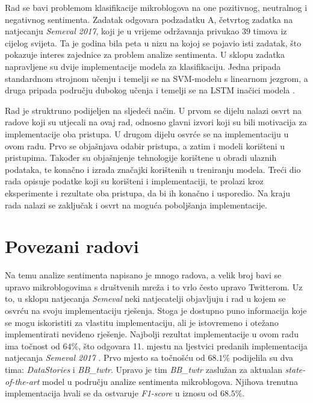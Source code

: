 \documentclass[times, utf8, zavrsni]{fer}
\begin{document}
Rad se bavi problemom klasifikacije mikroblogova na one pozitivnog, neutralnog i negativnog sentimenta. Zadatak odgovara podzadatku A, četvrtog zadatka na natjecanju \emph{Semeval 2017}, koji je u vrijeme održavanja privukao $39$ timova iz cijelog svijeta. Ta je godina bila peta u nizu na kojoj se pojavio isti zadatak, što pokazuje interes zajednice za problem analize sentimenta. U sklopu zadatka napravljene su dvije implementacije modela za klasifikaciju. Jedna pripada standardnom strojnom učenju i temelji se na \gls{SVM}-modelu s linearnom jezgrom, a druga pripada području dubokog učenja i temelji se na \Gls{LSTM} inačici modela .

Rad je struktruno podijeljen na sljedeći način. U prvom se dijelu nalazi osvrt na radove koji su utjecali na ovaj rad, odnosno glavni izvori koji su bili motivacija za implementacije oba pristupa. U drugom dijelu osvrće se na implementaciju u ovom radu. Prvo se objašnjava odabir pristupa, a zatim i modeli korišteni u pristupima. Također su objašnjenje tehnologije korištene u obradi ulaznih podataka, te konačno i izrada značajki korištenih u treniranju modela. Treći dio rada opisuje podatke koji su korišteni i implementaciji, te prolazi kroz eksperimente i rezultate oba pristupa, da bi ih konačno i usporedio. Na kraju rada nalazi se zaključak i osvrt na moguća poboljšanja implementacije.

\chapter{Povezani radovi}


Na temu analize sentimenta napisano je mnogo radova, a velik broj bavi se upravo mikroblogovima s društvenih mreža i to vrlo često upravo Twitterom. Uz to, u sklopu natjecanja \emph{Semeval} neki natjecatelji objavljuju i rad u kojem se osvrću na svoju implementaciju rješenja. Stoga je dostupno puno informacija koje se mogu iskoristiti za vlastitu implementaciju, ali je istovremeno i otežano implementirati neviđeno rješenje. 
Najbolji rezultat implementacije u ovom radu ima točnost od $64\%$, što odgovara 11. mjestu na ljestvici predanih implementacija natjecanja \emph{Semeval 2017} \citep{semeval2017task4}. Prvo mjesto sa točnošću od $68.1\%$ podijelila su dva tima: \textit{DataStories} i \textit{BB\_twtr}. Upravo je tim \textit{BB\_twtr} zaslužan za aktualan \textit{state-of-the-art} model u području analize sentimenta mikroblogova. Njihova trenutna implementacija hvali se da ostvaruje \textit{F1-score} u iznosu od $68.5\%$.
\end{document}
